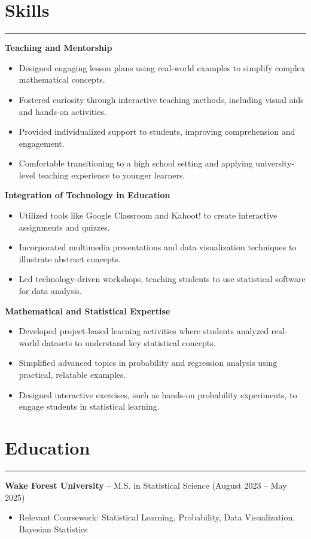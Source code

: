 \documentclass[a4paper,11pt]{article}
\begin{document}
\section*{Skills}
\hrule \vspace{2mm}
\textbf{Teaching and Mentorship}
\begin{itemize}
    \item Designed engaging lesson plans using real-world examples to simplify complex mathematical concepts.
    \item Fostered curiosity through interactive teaching methods, including visual aids and hands-on activities.
    \item Provided individualized support to students, improving comprehension and engagement.
    \item Comfortable transitioning to a high school setting and applying university-level teaching experience to younger learners.
\end{itemize}

\textbf{Integration of Technology in Education}
\begin{itemize}
    \item Utilized tools like Google Classroom and Kahoot! to create interactive assignments and quizzes.
    \item Incorporated multimedia presentations and data visualization techniques to illustrate abstract concepts.
    \item Led technology-driven workshops, teaching students to use statistical software for data analysis.
\end{itemize}

\textbf{Mathematical and Statistical Expertise}
\begin{itemize}
    \item Developed project-based learning activities where students analyzed real-world datasets to understand key statistical concepts.
    \item Simplified advanced topics in probability and regression analysis using practical, relatable examples.
    \item Designed interactive exercises, such as hands-on probability experiments, to engage students in statistical learning.
\end{itemize}

\section*{Education}
\hrule \vspace{2mm}
\textbf{Wake Forest University} -- M.S. in Statistical Science (August 2023 -- May 2025)
\begin{itemize}
    \item Relevant Coursework: Statistical Learning, Probability, Data Visualization, Bayesian Statistics
\end{itemize}
\end{document}
